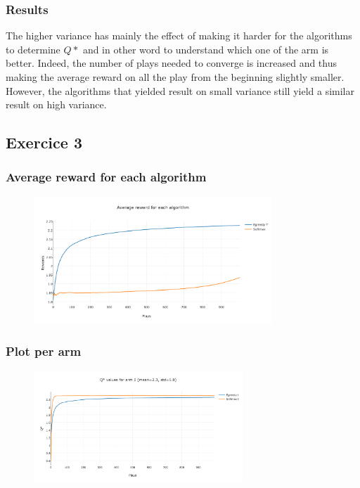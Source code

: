 \documentclass[11pt]{article}
\begin{document}
\subsubsection{Results}

The higher variance has mainly the effect of making it harder for the algorithms to determine $Q*$ and in other word to understand which one of the arm is better. Indeed, the number of plays needed to converge is increased and thus making the average reward on all the play from the beginning slightly smaller. However, the algorithms that yielded result on small variance still yield a similar result on high variance.

\subsection{Exercice 3}


\subsubsection{Average reward for each algorithm}

\begin{figure}[H]
   \centering
   \includegraphics[width=0.8\textwidth]{img/1-3/reward.png}
\end{figure}

\subsubsection{Plot per arm}

\begin{figure}[H]
   \centering
   \includegraphics[width=0.7\textwidth]{img/1-3/q1.png}
\end{figure}
\end{document}
